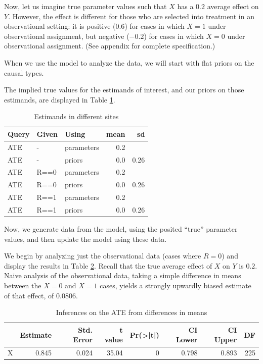 \documentclass[
  12pt,
]{book}
\begin{document}
Now, let us imagine true parameter values such that \(X\) has a \(0.2\) average effect on \(Y\). However, the effect is different for those who are selected into treatment in an observational setting: it is positive (\(0.6\)) for cases in which \(X=1\) under observational assignment, but negative (\(-0.2\)) for cases in which \(X=0\) under observational assignment. (See appendix for complete specification.)

When we use the model to analyze the data, we will start with flat priors on the causal types.

The implied true values for the estimands of interest, and our priors on those estimands, are displayed in Table \ref{tab:fusionestimands}.

\begin{table}

\caption{\label{tab:fusionestimands}Estimands in different sites}
\centering
\begin{tabular}[t]{l|l|l|r|r}
\hline
Query & Given & Using & mean & sd\\
\hline
ATE & - & parameters & 0.2 & \\
\hline
ATE & - & priors & 0.0 & 0.26\\
\hline
ATE & R==0 & parameters & 0.2 & \\
\hline
ATE & R==0 & priors & 0.0 & 0.26\\
\hline
ATE & R==1 & parameters & 0.2 & \\
\hline
ATE & R==1 & priors & 0.0 & 0.26\\
\hline
\end{tabular}
\end{table}

Now, we generate data from the model, using the posited ``true'' parameter values, and then update the model using these data.

We begin by analyzing just the observational data (cases where \(R=0\)) and display the results in Table \ref{tab:fusiondim}. Recall that the true average effect of \(X\) on \(Y\) is \(0.2\). Naive analysis of the observational data, taking a simple difference in means between the \(X=0\) and \(X=1\) cases, yields a strongly upwardly biased estimate of that effect, of 0.0806.

\begin{table}

\caption{\label{tab:fusiondim}Inferences on the ATE from differences in means}
\centering
\begin{tabular}[t]{l|r|r|r|r|r|r|r}
\hline
  & Estimate & Std. Error & t value & Pr(>|t|) & CI Lower & CI Upper & DF\\
\hline
X & 0.845 & 0.024 & 35.04 & 0 & 0.798 & 0.893 & 225\\
\hline
\end{tabular}
\end{table}
\end{document}
